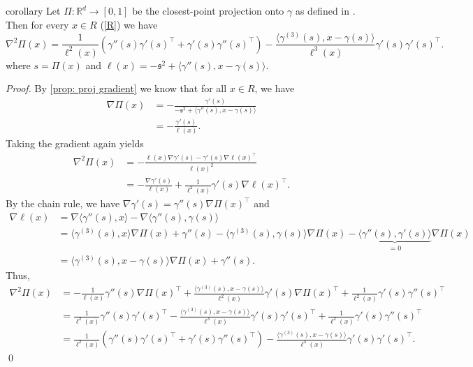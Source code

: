 \documentclass[11pt]{article}
\begin{document}
\begin{appendices}
\begin{restatable}{corollary}{} \label{prop: proj hessian}
    Let $\Pi: \mathbb{R}^d \rightarrow [0, 1]$ be the closest-point projection onto $\gamma$ as defined in . Then for every $x \in R$ (\cref{R})
    we have
    \[\nabla^2\Pi(x) = \frac{1}{\ell^2(x)}\left(\gamma''(s)\gamma'(s)^{\top} + \gamma'(s)\gamma''(s)^{\top}\right)- \frac{\langle\gamma^{(3)}(s), x - \gamma(s)\rangle}{\ell^3(x)}\gamma'(s)\gamma'(s)^{\top}.\]
    where $s = \Pi(x)$ and $\ell(x) = -\mathfrak s^2 + \langle\gamma''(s), x-\gamma(s)\rangle$.
\end{restatable}
\noindent \textit{Proof.} By \cref{prop: proj gradient} we know that for all $x \in R$, we have
\begin{align}
    \nabla\Pi(x) &= -\frac{\gamma'(s)}{-\mathfrak s^2 + \langle\gamma''(s), x - \gamma(s)\rangle} \\
    &= -\frac{\gamma'(s)}{\ell(x)}.
\end{align}
Taking the gradient again yields
\begin{align}
    \nabla^2\Pi(x) &= -\frac{\ell(x)\nabla \gamma'(s) - \gamma'(s)\nabla \ell(x)^{\top}}{\ell(x)^2} \\
    &= -\frac{\nabla \gamma'(s)}{\ell(x)} + \frac{1}{\ell^2(x)}\gamma'(s)\nabla \ell(x)^{\top}.
\end{align}
By the chain rule, we have $\nabla\gamma'(s) = \gamma''(s)\nabla\Pi(x)^{\top}$ and 
\begin{align}
    \nabla \ell(x) &= \nabla\langle\gamma''(s), x\rangle -\nabla\langle \gamma''(s), \gamma(s)\rangle \\
    &= \langle \gamma^{(3)}(s), x\rangle \nabla\Pi(x) + \gamma''(s) - \langle\gamma^{(3)}(s), \gamma(s)\rangle\nabla\Pi(x) - \underbrace{\langle\gamma''(s), \gamma'(s)\rangle}_{= 0}\nabla\Pi(x) \\
    &= \langle\gamma^{(3)}(s), x - \gamma(s)\rangle\nabla\Pi(x) + \gamma''(s).
\end{align}
Thus,
\begin{align*}
    \nabla^2\Pi(x) &= -\frac{1}{\ell(x)}\gamma''(s)\nabla\Pi(x)^{\top} + \frac{\langle\gamma^{(3)}(s), x - \gamma(s)\rangle}{\ell^2(x)}\gamma'(s)\nabla\Pi(x)^{\top} + \frac{1}{\ell^2(x)}\gamma'(s)\gamma''(s)^{\top} \\
    &= \frac{1}{\ell^2(x)}\gamma''(s)\gamma'(s)^{\top} - \frac{\langle\gamma^{(3)}(s), x - \gamma(s)\rangle}{\ell^3(x)}\gamma'(s)\gamma'(s)^{\top} + \frac{1}{\ell^2(x)}\gamma'(s)\gamma''(s)^{\top} \\
    &= \frac{1}{\ell^2(x)}\left(\gamma''(s)\gamma'(s)^{\top} + \gamma'(s)\gamma''(s)^{\top}\right)- \frac{\langle\gamma^{(3)}(s), x - \gamma(s)\rangle}{\ell^3(x)}\gamma'(s)\gamma'(s)^{\top}.
\end{align*}
\qed{}



\end{appendices}
\end{document}
